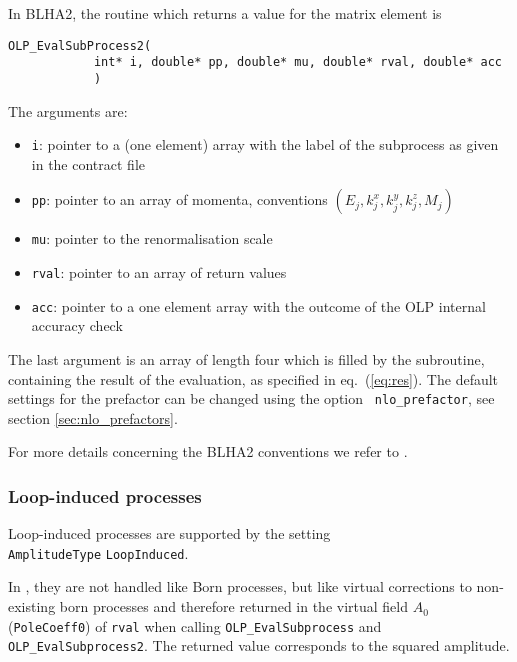 In BLHA2, the routine which returns a value for the matrix element is
\begin{lstlisting}[style=C]
      OLP_EvalSubProcess2(
            int* i, double* pp, double* mu, double* rval, double* acc
            )
\end{lstlisting}


The arguments are:
\begin{itemize}
\item \texttt{i}: pointer to a (one element) array with the label of the subprocess as given in the contract file
\item \texttt{pp}: pointer to an array of momenta, conventions $(E_j,k_j^x,k_j^y,k_j^z,M_j)$
\item \texttt{mu}: pointer to the renormalisation scale 
\item \texttt{rval}: pointer to an array of return values
\item \texttt{acc}: pointer to a one element array with the outcome of the 
OLP internal accuracy check 
\end{itemize}


The last argument is an array of length four which is filled by the subroutine, 
containing the result of the evaluation, as specified in eq.~(\ref{eq:res}).
The default settings for the prefactor can be changed using the option \texttt{ nlo\_prefactor}, 
see section \ref{sec:nlo_prefactors}.

For more details concerning the BLHA2 conventions we refer to \cite{Alioli:2013nda}.

\subsubsection{Loop-induced processes}

Loop-induced processes are supported by the setting \\
\texttt{AmplitudeType} \texttt{LoopInduced}.

In \gosam, they are not handled like Born processes, but like virtual corrections to non-existing born processes
and therefore returned in the virtual field $A_0$ (\texttt{PoleCoeff0}) of \texttt{rval} when calling \texttt{OLP\_EvalSubprocess} and \texttt{OLP\_EvalSubprocess2}. The returned value corresponds to
the  squared amplitude.


